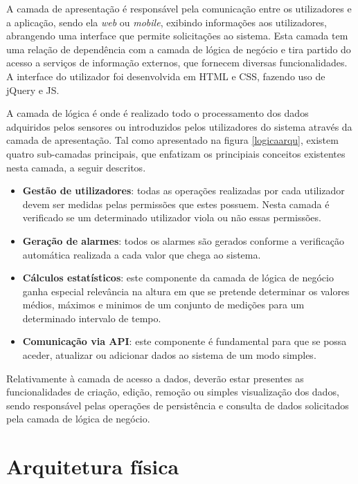 A camada de apresentação é responsável pela comunicação entre os utilizadores e a aplicação, sendo ela \textit{web} ou \textit{mobile}, exibindo informações aos utilizadores, abrangendo uma interface que permite solicitações ao sistema. Esta camada tem uma relação de dependência com a camada de lógica de negócio e tira partido do acesso a serviços de informação externos, que fornecem diversas funcionalidades. A interface do utilizador foi desenvolvida em  \ac{HTML} e \acs{CSS}, fazendo uso de jQuery e \ac{JS}.





A camada de lógica é onde é realizado todo o processamento dos dados adquiridos pelos sensores ou introduzidos pelos utilizadores do sistema através da camada de apresentação.  Tal como apresentado na figura \ref{logicaarqu}, existem quatro sub-camadas principais, que enfatizam os principiais conceitos existentes nesta camada, a seguir descritos.  


\begin{itemize}
	\item \textbf{Gestão de utilizadores}: todas as operações realizadas por cada utilizador devem ser medidas pelas permissões que estes possuem. Nesta camada é verificado se um determinado utilizador viola ou não essas permissões. 
	
	\item \textbf{Geração de alarmes}: todos os alarmes são gerados conforme a verificação automática realizada a cada valor que chega ao sistema. 
	\item \textbf{Cálculos estatísticos}: este componente da camada de lógica de negócio ganha especial relevância na altura em que se pretende determinar os valores médios, máximos e minimos de um conjunto de medições para um determinado intervalo de tempo. 
	\item \textbf{Comunicação via \ac{API}}: este componente é fundamental para que se possa aceder, atualizar ou adicionar dados ao sistema de um modo simples.
\end{itemize}



Relativamente à camada de acesso a dados, deverão estar presentes as funcionalidades de criação, edição, remoção ou simples visualização dos dados, sendo responsável pelas operações de persistência e consulta de dados solicitados pela camada de lógica de negócio.


\section{Arquitetura física}


